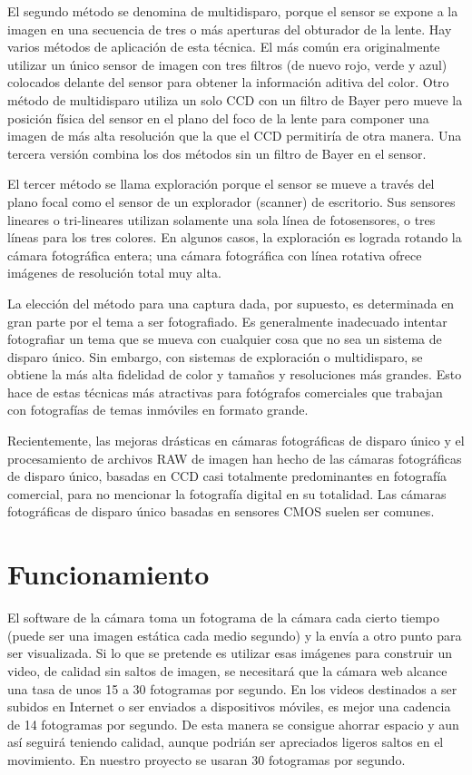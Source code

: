 \documentclass[12pt,a4paper]{report}
\begin{document}
El segundo método se denomina de multidisparo, porque el sensor se expone a la
imagen en una secuencia de tres o más aperturas del obturador de la lente. Hay
varios métodos de aplicación de esta técnica. El más común era originalmente
utilizar un único sensor de imagen con tres filtros (de nuevo rojo, verde y
azul) colocados delante del sensor para obtener la información aditiva del
color. Otro método de multidisparo utiliza un solo CCD con un filtro de Bayer
pero mueve la posición física del sensor en el plano del foco de la lente para
componer una imagen de más alta resolución que la que el CCD permitiría de otra
manera. Una tercera versión combina los dos métodos sin un filtro de Bayer en el
sensor.

El tercer método se llama exploración porque el sensor se mueve a través del
plano focal como el sensor de un explorador (scanner) de escritorio. Sus
sensores lineares o tri-lineares utilizan solamente una sola línea de
fotosensores, o tres líneas para los tres colores. En algunos casos, la
exploración es lograda rotando la cámara fotográfica entera; una cámara
fotográfica con línea rotativa ofrece imágenes de resolución total muy alta.

La elección del método para una captura dada, por supuesto, es determinada en
gran parte por el tema a ser fotografiado. Es generalmente inadecuado intentar
fotografiar un tema que se mueva con cualquier cosa que no sea un sistema de
disparo único. Sin embargo, con sistemas de exploración o multidisparo, se
obtiene la más alta fidelidad de color y tamaños y resoluciones más grandes.
Esto hace de estas técnicas más atractivas para fotógrafos comerciales que
trabajan con fotografías de temas inmóviles en formato grande.

Recientemente, las mejoras drásticas en cámaras fotográficas de disparo único y
el procesamiento de archivos RAW de imagen han hecho de las cámaras fotográficas
de disparo único, basadas en CCD casi totalmente predominantes en fotografía
comercial, para no mencionar la fotografía digital en su totalidad. Las cámaras
fotográficas de disparo único basadas en sensores CMOS suelen ser comunes.

\section{Funcionamiento}

El software de la cámara toma un fotograma de la cámara cada cierto tiempo
(puede ser una imagen estática cada medio segundo) y la envía a otro punto para
ser visualizada. Si lo que se pretende es utilizar esas imágenes para construir
un video, de calidad sin saltos de imagen, se necesitará que la cámara web
alcance una tasa de unos 15 a 30 fotogramas por segundo.
En los videos destinados a ser subidos en Internet o ser enviados a dispositivos
móviles, es mejor una cadencia de 14 fotogramas por segundo. De esta manera se
consigue ahorrar espacio y aun así seguirá teniendo calidad, aunque podrián ser
apreciados ligeros saltos en el movimiento. En nuestro proyecto se usaran 30
fotogramas por segundo.
\end{document}
